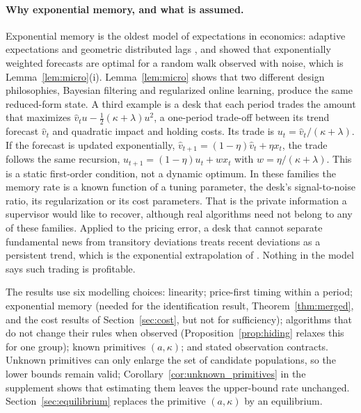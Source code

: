 
\paragraph{Why exponential memory, and what is assumed.} Exponential memory is the oldest model of expectations in economics: adaptive expectations \citep{cagan1956,nerlove1958} and geometric distributed lags \citep{koyck1954}, and \citet{muth1960} showed that exponentially weighted forecasts are optimal for a random walk observed with noise, which is Lemma~\ref{lem:micro}(i). Lemma~\ref{lem:micro} shows that two different design philosophies, Bayesian filtering and regularized online learning, produce the same reduced-form state. A third example is a desk that each period trades the amount that maximizes $\hat v_tu-\tfrac12(\kappa+\lambda)u^2$, a one-period trade-off between its trend forecast $\hat v_t$ and quadratic impact and holding costs. Its trade is $u_t=\hat v_t/(\kappa+\lambda)$. If the forecast is updated exponentially, $\hat v_{t+1}=(1-\eta)\hat v_t+\eta x_t$, the trade follows the same recursion, $u_{t+1}=(1-\eta)u_t+wx_t$ with $w=\eta/(\kappa+\lambda)$. This is a static first-order condition, not a dynamic optimum. In these families the memory rate is a known function of a tuning parameter, the desk's signal-to-noise ratio, its regularization or its cost parameters. That is the private information a supervisor would like to recover, although real algorithms need not belong to any of these families. Applied to the pricing error, a desk that cannot separate fundamental news from transitory deviations treats recent deviations as a persistent trend, which is the exponential extrapolation of \citet{barberis2015,barberis2018}. Nothing in the model says such trading is profitable.

The results use six modelling choices: linearity; price-first timing within a period; exponential memory (needed for the identification result, Theorem~\ref{thm:merged}, and the cost results of Section~\ref{sec:cost}, but not for sufficiency); algorithms that do not change their rules when observed (Proposition~\ref{prop:hiding} relaxes this for one group); known primitives $(a,\kappa)$; and stated observation contracts. Unknown primitives can only enlarge the set of candidate populations, so the lower bounds remain valid; Corollary~\ref{cor:unknown_primitives} in the supplement shows that estimating them leaves the upper-bound rate unchanged. Section~\ref{sec:equilibrium} replaces the primitive $(a,\kappa)$ by an equilibrium.

